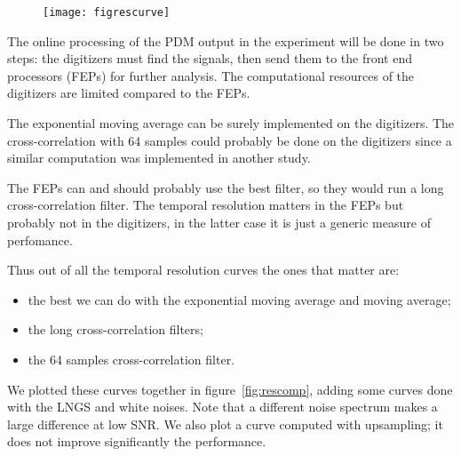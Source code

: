\begin{figure}
    \hspace{-0.09\textwidth}
    \texttt{[image: figrescurve]}
    

\end{figure}

The online processing of the PDM output in the experiment will be done in two
steps: the digitizers must find the signals, then send them to the front end
processors (FEPs) for further analysis. The computational resources of the
digitizers are limited compared to the FEPs.


The exponential moving average can be surely implemented on the digitizers. The
cross-correlation with 64 samples could probably be done on the digitizers
since a similar computation was implemented in another study.

The FEPs can and should probably use the best filter, so they would run a long
cross-correlation filter. The temporal resolution matters in the FEPs but
probably not in the digitizers, in the latter case it is just a generic measure
of perfomance.

Thus out of all the temporal resolution curves the ones that matter are:
%
\begin{itemize}
    \item the best we can do with the exponential moving average and moving
    average;
    \item the long cross-correlation filters;
    \item the 64 samples cross-correlation filter.
\end{itemize}
%
We plotted these curves together in figure~\ref{fig:rescomp}, adding some
curves done with the LNGS and white noises. Note that a different noise
spectrum makes a large difference at low SNR. We also plot a curve computed
with upsampling; it does not improve significantly the performance.


